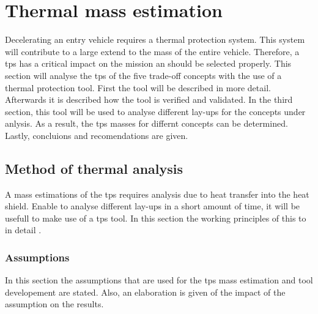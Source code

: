 \section{Thermal mass estimation}
\label{ch:thermtool}
Decelerating an entry vehicle requires a thermal protection system. This system will contribute to a large extend to the mass of the entire vehicle. Therefore, a \gls{tps} has a critical impact on the mission an should be selected properly. This section will analyse the \gls{tps} of the five trade-off concepts with the use of a thermal protection tool. First the tool will be described in more detail. Afterwards it is described how the tool is verified and validated. In the third section, this tool will be used to analyse different lay-ups for the concepts under anlysis. As a result, the \gls{tps} masses for differnt concepts can be determined. Lastly, concluions and recomendations are given.\\

\subsection{Method of thermal analysis}
A mass estimations of the \gls{tps} requires analysis due to heat transfer into the heat shield. Enable to analyse different lay-ups in a short amount of time, it will be usefull to make use of a \gls{tps} tool. In this section the working principles of this to in detail .\\

\subsubsection{Assumptions}
In this section the assumptions that are used for the \gls{tps} mass estimation and tool developement are stated. Also, an elaboration is given of the impact of the assumption on the results.\\

